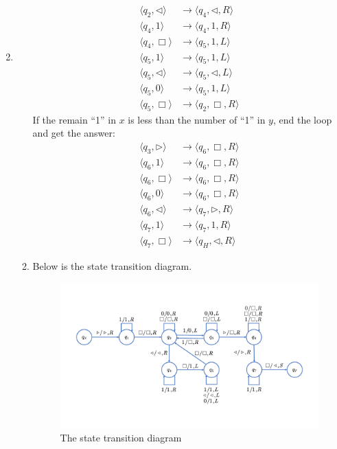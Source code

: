 \documentclass[12pt,a4paper]{article}
\makeatletter
\newtheorem*{solution}{Solution}
\theoremstyle{definition}
\renewenvironment{solution}[1][Solution] {\par\pushQED{\qed}\normalfont\topsep6\p@\@plus6\p@\relax\trivlist\item[\hskip\labelsep\bfseries#1\@addpunct{.}]\ignorespaces}{\popQED\endtrivlist\@endpefalse} \makeatother
\makeatother
\begin{document}
\begin{enumerate}
\begin{solution}
\begin{enumerate}
			\begin{align*}
				\langle q_2, \triangleleft \rangle &\rightarrow \langle q_4, \triangleleft,  R\rangle \\
				\langle q_4, 1 \rangle &\rightarrow \langle q_4, 1,  R\rangle\\
				\langle q_4, \Box \rangle &\rightarrow \langle q_5, 1,  L\rangle\\
				\langle q_5, 1 \rangle &\rightarrow \langle q_5, 1,  L\rangle\\
				\langle q_5, \triangleleft \rangle &\rightarrow \langle q_5, \triangleleft,  L\rangle\\
				\langle q_5, 0 \rangle &\rightarrow \langle q_5, 1,  L\rangle\\
				\langle q_5, \Box \rangle &\rightarrow \langle q_2, \Box,  R\rangle
			\end{align*}
			If the remain ``1'' in $ x $ is less than the number of ``1'' in $ y $, end the loop and get the answer:
			\begin{align*}
				\langle q_3, \triangleright  \rangle &\rightarrow \langle q_6, \Box,  R\rangle \\
				\langle q_6, 1  \rangle &\rightarrow \langle q_6, \Box,  R\rangle \\
				\langle q_6, \Box \rangle &\rightarrow \langle q_6, \Box,  R\rangle \\
				\langle q_6, 0  \rangle &\rightarrow \langle q_6, \Box,  R\rangle \\
				\langle q_6, \triangleleft  \rangle &\rightarrow \langle q_7, \triangleright,  R\rangle \\
				\langle q_7, 1  \rangle &\rightarrow \langle q_7, 1,  R\rangle \\
				\langle q_7, \Box \rangle &\rightarrow \langle q_H, \triangleleft,  R\rangle 
			\end{align*}

			\item Below is the state transition diagram.
			\begin{figure}[H]
				\centering
				\includegraphics[width=\textwidth]{std.pdf}
				\caption{The state transition diagram}
				\end{figure}


\end{enumerate}
\end{solution}
\end{enumerate}
\end{document}
